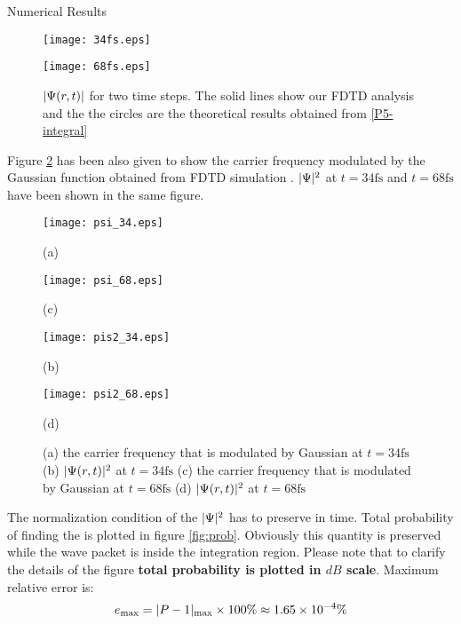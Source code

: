 \begin{homeworkProblem}
\begin{homeworkSection}{Numerical Results}
\begin{figure}[!h]
\begin{minipage}[b]{1\linewidth}
\centering
\texttt{[image: 34fs.eps]}
\end{minipage}
\begin{minipage}[b]{1\linewidth}
\centering
\texttt{[image: 68fs.eps]}
\end{minipage}
\caption{\small  $\lvert\Psi(r,t)\rvert$ for two time steps. The solid lines show our FDTD analysis and the the circles are the theoretical results obtained from \eqref{P5-integral}}
\label{fig:Psi}
\end{figure}

\newpage
Figure \ref{fig-new} has been also given to show the carrier frequency modulated by the Gaussian function obtained from FDTD simulation . $\lvert\Psi\rvert^2$ at $t=34\mathrm{fs}$ and $t=68\mathrm{fs}$ have been shown  in the same figure. 

\begin{figure}[!h]
 \begin{minipage}[b]{0.5\linewidth}
 \centering
 \texttt{[image: psi\_34.eps]}
 \centerline{\small (a)}
  \end{minipage}
 \hspace{0.5cm}
 \begin{minipage}[b]{0.5\linewidth}
 \centering
 \texttt{[image: psi\_68.eps]}
 \centerline{\small (c) }
 \end{minipage}
\begin{minipage}[b]{0.5\linewidth}
 \centering
 \texttt{[image: pis2\_34.eps]}
 \centerline{\small (b)}
  \end{minipage}
  \hspace{0.5cm}
 \begin{minipage}[b]{0.5\linewidth}
 \centering
 \texttt{[image: psi2\_68.eps]}
 \centerline{\small (d)}
 \end{minipage}
  \caption{\small (a) the carrier frequency that is modulated by Gaussian at $t=34 \mathrm{fs}$ 
  (b) $\lvert\Psi(r,t)\rvert^2$ at $t=34\mathrm{fs}$  
  (c) the carrier frequency that is modulated by Gaussian at $t=68 \mathrm{fs}$ 
  (d) $\lvert\Psi(r,t)\rvert^2$ at $t=68\mathrm{fs}$  }
 \label{fig-new}
 \end{figure}


\newpage
The normalization condition of the $\lvert\Psi\rvert^2$ has to preserve in time. Total probability of finding the is plotted in figure \ref{fig:prob}. Obviously this quantity is preserved while the wave packet is inside the integration region. Please note that to clarify the details of the figure \textbf{total probability is plotted in $dB$ scale}. Maximum relative error is:
\begin{equation}
e_{\max}=\lvert P-1\rvert_{\max}\times 100\%\approx 1.65\times 10^{-4}\%
\end{equation}  


\end{homeworkSection}
\end{homeworkProblem}
